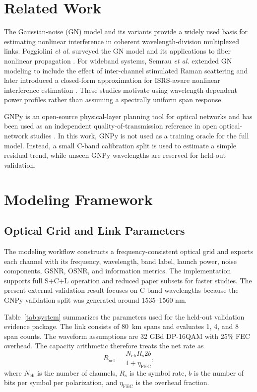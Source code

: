 \documentclass[conference]{IEEEtran}
\begin{document}
\section{Related Work}
The Gaussian-noise (GN) model and its variants provide a widely used basis for estimating nonlinear interference in coherent wavelength-division multiplexed links. Poggiolini \textit{et al.} surveyed the GN model and its applications to fiber nonlinear propagation \cite{poggiolini2014gn}. For wideband systems, Semrau \textit{et al.} extended GN modeling to include the effect of inter-channel stimulated Raman scattering and later introduced a closed-form approximation for ISRS-aware nonlinear interference estimation \cite{semrau2018isrsgn,semrau2019closed}. These studies motivate using wavelength-dependent power profiles rather than assuming a spectrally uniform span response.

GNPy is an open-source physical-layer planning tool for optical networks and has been used as an independent quality-of-transmission reference in open optical-network studies \cite{ferrari2020gnpy}. In this work, GNPy is not used as a training oracle for the full model. Instead, a small C-band calibration split is used to estimate a simple residual trend, while unseen GNPy wavelengths are reserved for held-out validation.

\section{Modeling Framework}
\subsection{Optical Grid and Link Parameters}
The modeling workflow constructs a frequency-consistent optical grid and exports each channel with its frequency, wavelength, band label, launch power, noise components, GSNR, OSNR, and information metrics. The implementation supports full S+C+L operation and reduced paper subsets for faster studies. The present external-validation result focuses on C-band wavelengths because the GNPy validation split was generated around 1535--1560 nm.

Table~\ref{tab:system} summarizes the parameters used for the held-out validation evidence package. The link consists of \SI{80}{km} spans and evaluates 1, 4, and 8 span counts. The waveform assumptions are 32 GBd DP-16QAM with 25\% FEC overhead. The capacity arithmetic therefore treats the net rate as
\begin{equation}
    R_{\mathrm{net}} = \frac{N_{\mathrm{ch}} R_s 2 b}{1+\eta_{\mathrm{FEC}}},
\end{equation}
where $N_{\mathrm{ch}}$ is the number of channels, $R_s$ is the symbol rate, $b$ is the number of bits per symbol per polarization, and $\eta_{\mathrm{FEC}}$ is the overhead fraction.
\end{document}
